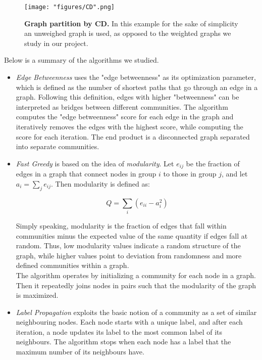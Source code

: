 \begin{figure}[h]
  \centering
  \texttt{[image: "figures/CD".png]}
  \caption{\textbf{Graph partition by \acrlong{CD}.} In this example for the sake of simplicity an unweighed graph is used, as opposed to the weighted graphs we study in our project.}
  \label{fig:CD}
\end{figure}

Below is a summary of the algorithms we studied.
\begin{itemize}

\item \textit{Edge Betweenness}\cite{girvannewman2002} uses the "edge betweenness" as its optimization parameter, which is defined as the number of shortest paths that go through an edge in a graph. Following this definition, edges with higher "betweenness" can be interpreted as bridges between different communities. The algorithm computes the "edge betweenness" score for each edge in the graph and iteratively removes the edges with the highest score, while computing the score for each iteration. The end product is a disconnected graph separated into separate communities.

\item \textit{Fast Greedy}\cite{Newman_2004} is based on the idea of \textit{modularity}. Let $e_{ij}$ be the fraction of edges in a graph that connect nodes in group $i$ to those in group $j$, and let 
$a_i = \sum_j e_{ij}$. Then modularity is defined as:

\begin{equation}
\label{eqn:modularity}
Q = \sum_i (e_{ii}-a_i^2)
\end{equation}

Simply speaking, modularity is the fraction of edges that fall within communities minus the expected value of the same quantity if edges fall at random. Thus, low modularity values indicate a random structure of the graph, while higher values point to deviation from randomness and more defined communities within a graph.\\
The algorithm operates by initializing a community for each node in a graph. Then it repeatedly joins nodes in pairs such that the modularity of the graph is maximized.

\item \textit{Label Propagation}\cite{Raghavan_2007} exploits the basic notion of a community as a set of similar neighbouring nodes. Each node starts with a unique label, and after each iteration, a node updates its label to the most common label of its neighbours. The algorithm stops when each node has a label that the maximum number of its neighbours have.


\end{itemize}
